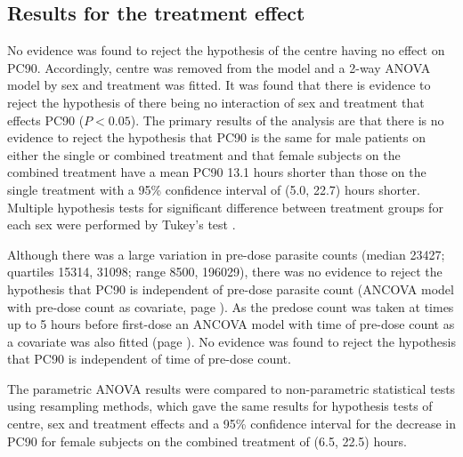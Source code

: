 \subsection{Results for the treatment effect}
No evidence was found to reject the hypothesis of the centre having no effect on PC90. Accordingly, centre was removed from the model and a 2-way ANOVA model by sex and treatment was fitted. It was found that there is evidence to reject the hypothesis of there being no interaction of sex and treatment that effects PC90 ($P<0.05$). The primary results of the analysis are that there is no evidence to reject the hypothesis that PC90 is the same for male patients on either the single or combined treatment and that female subjects on the combined treatment have a mean PC90 13.1 hours shorter than those on the single treatment with a 95\% confidence interval of (5.0, 22.7) hours shorter. Multiple hypothesis tests for significant difference between treatment groups for each sex were performed by Tukey's test \cite{montgomery}.

Although there was a large variation in pre-dose parasite counts (median 23427; quartiles 15314, 31098; range 8500, 196029), there was no evidence to reject the hypothesis that PC90 is independent of pre-dose parasite count (ANCOVA model with pre-dose count as covariate, page \pageref{sec:predoseancova}). As the predose count was taken at times up to 5 hours before first-dose an ANCOVA model with time of pre-dose count as a covariate was also fitted (page \pageref{sec:pretimeancova}). No evidence was found to reject the hypothesis that PC90 is independent of time of pre-dose count. 

The parametric ANOVA results were compared to non-parametric statistical tests using resampling methods, which gave the same results for hypothesis tests of centre, sex and treatment effects and a 95\% confidence interval for the decrease in PC90 for female subjects on the combined treatment of (6.5, 22.5) hours.

